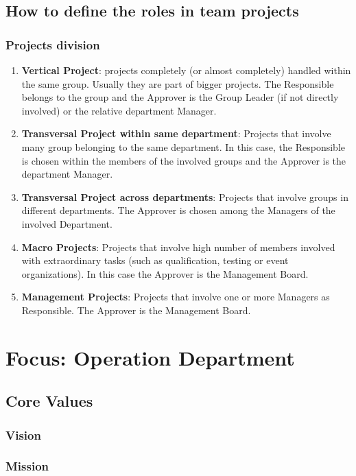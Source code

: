 \documentclass[graybox]{svmult}
\begin{document}
\subsection{How to define the roles in team projects}
\subsubsection{Projects division}
\begin{enumerate}
\item \textbf{Vertical Project}: projects completely (or almost completely) handled within the same group. Usually they are part of bigger projects. The Responsible belongs to the group and the Approver is the Group Leader (if not directly involved) or the relative department Manager.
\item \textbf{Transversal Project within same department}: Projects that involve many group belonging to the same department. In this case, the Responsible is chosen within the members of the involved groups and the Approver is the department Manager.
\item \textbf{Transversal Project across departments}: Projects that involve groups in different departments. The Approver is chosen among the Managers of the involved Department.
\item \textbf{Macro Projects}: Projects that involve high number of members involved with extraordinary tasks (such as qualification, testing or event organizations). In this case the Approver is the Management Board.
\item \textbf{Management Projects}: Projects that involve one or more Managers as Responsible. The Approver is the Management Board.
\end{enumerate}

\section{Focus: Operation Department}
\label{sec:4}
\subsection{Core Values}
\subsubsection*{Vision}
\subsubsection*{Mission}
\end{document}
